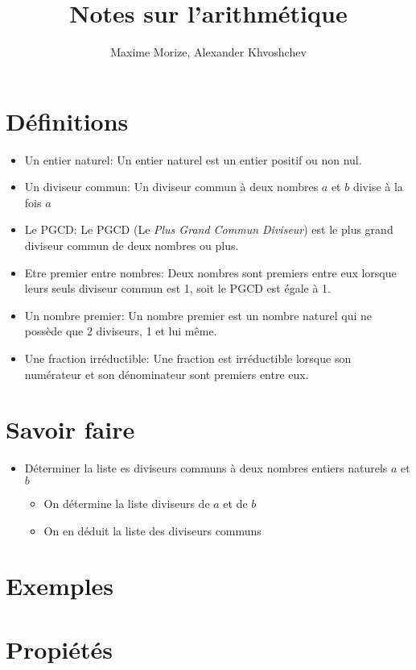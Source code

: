 \documentclass[14pt, letterpaper]{article}
\author{Maxime Morize, Alexander Khvoshchev}
\title{Notes sur l'arithm\'etique}
\begin{document}
\maketitle
\section{D\'efinitions}
\begin{itemize}
  \item{Un entier naturel:}
    Un entier naturel est un entier positif ou non nul.
  \item{Un diviseur commun:}
    Un diviseur commun \`a deux nombres \(a\) et \(b\) divise \`a la fois \(a\)
  \item{Le PGCD:}
    Le PGCD (Le\emph{ Plus Grand Commun Diviseur}) est le plus grand diviseur
    commun de deux nombres ou plus.
  \item{Etre premier entre nombres:}
    Deux nombres sont premiers entre eux lorsque leurs seuls diviseur commun est
    1, soit le PGCD est \'egale \`a 1.
  \item{Un nombre premier:}
    Un nombre premier est un nombre naturel qui ne poss\`ede que 2 diviseurs, 1
    et lui m\^eme.
  \item{Une fraction irr\'eductible:}
    Une fraction est irr\'eductible lorsque son num\'erateur et son
    d\'enominateur sont premiers entre eux.

\end{itemize}
\section{Savoir faire}
\begin{itemize}
\item{D\'eterminer la liste es diviseurs communs \`a deux nombres entiers
    naturels \(a\) et \(b\)}
    \begin{itemize}
      \item{On d\'etermine la liste diviseurs de \(a\) et de \(b\)}
      \item{On en d\'eduit la liste des diviseurs communs}
    \end{itemize}
\end{itemize}
\section{Exemples}
\section{Propi\'et\'es}
\end{document}
